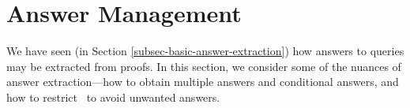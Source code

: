 





\section{Answer Management}
\label{sec-answer-extraction}
We have seen (in Section \ref{subsec-basic-answer-extraction}) how
answers to queries may be extracted from proofs.  In this section, we
consider some of the nuances of answer extraction---how to obtain
multiple answers and conditional answers, and how to restrict \snark\
to avoid unwanted answers.

